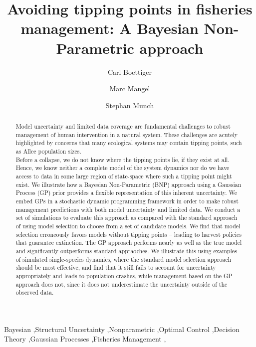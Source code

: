 \documentclass[author-year, 12pt,review]{elsarticle} %
\begin{document}
\begin{frontmatter}

  \title{Avoiding tipping points in fisheries management: A Bayesian
Non-Parametric approach}
    \author[cstar]{Carl Boettiger}
    \author[cstar]{Marc Mangel}
  
  
    \author[noaa]{Stephan Munch}
  
  
      \address[cstar]{Center for Stock Assessment Research, Department of Applied Math and
Statistics, University of California, Mail Stop SOE-2, Santa Cruz, CA
95064, USA}    
    \address[marc]{Center for Stock Assessment Research, Department of Applied Math and
Statistics, University of California, Mail Stop SOE-2, Santa Cruz, CA
95064, USA and Department of Biology, University of Bergen, Bergen,
Norway 9020}    
    \address[noaa]{Southwest Fisheries Science Center, National Oceanic and Atmospheric
Administration, 110 Shaffer Road, Santa Cruz, CA 95060, USA}    
  
  \begin{abstract}
  Model uncertainty and limited data coverage are fundamental challenges
  to robust management of human intervention in a natural system. These
  challenges are acutely highlighted by concerns that many ecological
  systems may contain tipping points, such as Allee population
  sizes.\\Before a collapse, we do not know where the tipping points lie,
  if they exist at all. Hence, we know neither a complete model of the
  system dynamics nor do we have access to data in some large region of
  state-space where such a tipping point might exist. We illustrate how a
  Bayesian Non-Parametric (BNP) approach using a Gaussian Process (GP)
  prior provides a flexible representation of this inherent uncertainty.
  We embed GPs in a stochastic dynamic programming framework in order to
  make robust management predictions with both model uncertainty and
  limited data. We conduct a set of simulations to evaluate this approach
  as compared with the standard approach of using model selection to
  choose from a set of candidate models. We find that model selection
  erroneously favors models without tipping points -- leading to harvest
  policies that guarantee extinction. The GP approach performs nearly as
  well as the true model and significantly outperforms standard
  appraoches. We illustrate this using examples of simulated
  single-species dynamics, where the standard model selection approach
  should be most effective, and find that it still fails to account for
  uncertainty appropriately and leads to population crashes, while
  management based on the GP approach does not, since it does not
  underestimate the uncertainty outside of the observed data.
  \end{abstract}
   \begin{keyword} Bayesian \sep Structural Uncertainty \sep Nonparametric \sep Optimal Control \sep Decision Theory \sep Gaussian Processes \sep Fisheries Management \sep \end{keyword}
 \end{frontmatter}
\end{document}
